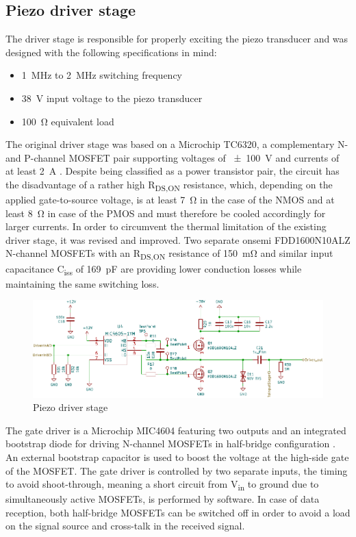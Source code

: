 \documentclass[
	english,
	ruledheaders=section, %
	class=report,%
	thesis={type=Project Seminar Report},%
	accentcolor=TUDa-1d, %
	custommargins=false,%
	marginpar=false,%
	parskip=half-,%
	fontsize=11pt,%
]{tudapub}
\begin{document}
\subsection{Piezo driver stage}\label{sec:driverschem}
The driver stage is responsible for properly exciting the piezo transducer and was designed with the following specifications in mind:
\begin{itemize}
  \item \SI{1}{\mega\hertz} to \SI{2}{\mega\hertz} switching frequency
  \item \SI{38}{\volt} input voltage to the piezo transducer
  \item \SI{100}{\ohm} equivalent load
\end{itemize}

The original driver stage was based on a Microchip TC6320, a complementary N- and P-channel \gls{MOSFET} pair supporting voltages of \SI{\pm100}{\volt} and currents of at least \SI{2}{\ampere} \autocite{microchiptechnologyinc.NChannelPChannelEnhancementMode2017}. Despite being classified as a power transistor pair, the circuit has the disadvantage of a rather high R\textsubscript{DS,ON} resistance, which, depending on the applied gate-to-source voltage, is at least \SI{7}{\ohm} in the case of the NMOS and at least \SI{8}{\ohm} in case of the PMOS and must therefore be cooled accordingly for larger currents. 
In order to circumvent the thermal limitation of the existing driver stage, it was revised and improved. Two separate onsemi FDD1600N10ALZ N-channel \glspl{MOSFET} \autocite{onsemiconductorcorporationNChannelPowerTrenchMOSFET2014} with an R\textsubscript{DS,ON} resistance of \SI{150}{\milli\ohm} and similar input capacitance C\textsubscript{iss} of \SI{169}{\pico\farad} are providing lower conduction losses while maintaining the same switching loss.

\begin{figure}[H]
    \centering
    \includegraphics[width=0.8\columnwidth]{schematics/sch_driver.pdf}
    \caption{Piezo driver stage}
    \label{sch:driverstage}
\end{figure}

The gate driver is a Microchip MIC4604 featuring two outputs and an integrated bootstrap diode for driving N-channel \glspl{MOSFET} in half-bridge configuration \autocite{microchiptechnologyinc.85VHalfBridgeMOSFET2018}. An external bootstrap capacitor is used to boost the voltage at the high-side gate of the \gls{MOSFET}. The gate driver is controlled by two separate inputs, the timing to avoid shoot-through, meaning a short circuit from V\textsubscript{in} to ground due to simultaneously active \glspl{MOSFET}, is performed by software. In case of data reception, both half-bridge \glspl{MOSFET} can be switched off in order to avoid a load on the signal source and cross-talk in the received signal.
\end{document}
